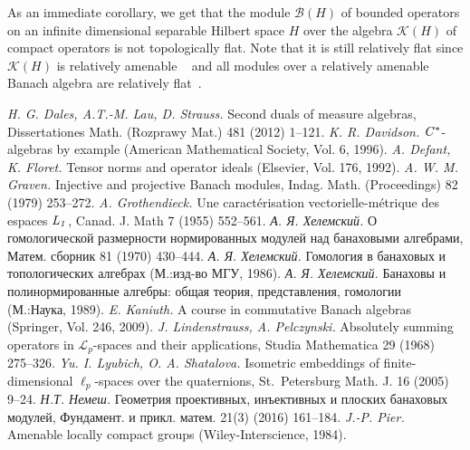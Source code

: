 \documentclass[12pt]{article}
\begin{document}
As an immediate corollary, we get that the module $\mathcal{B}(H)$ of bounded
operators on an infinite dimensional separable Hilbert space $H$ over the
algebra $\mathcal{K}(H)$ of compact operators is not topologically flat. Note
that it is still relatively flat since $\mathcal{K}(H)$ is relatively amenable
~\cite[VII.1.89]{HelBanLocConvAlg} and all modules over a relatively amenable
Banach algebra are relatively flat~\cite[VII.1.60(I)]{HelBanLocConvAlg}.


\begin{thebibliography}{999}

\textit{H. G. Dales, A.T.-M. Lau, D. Strauss.} Second duals of measure algebras,
Dissertationes Math. (Rozprawy Mat.) 481 (2012) 1--121.
%
\textit{K. R. Davidson.} $\it{C^*}$-algebras by example (American Mathematical
Society, Vol. 6, 1996).
%
\textit{A. Defant, K. Floret.} Tensor norms and operator ideals (Elsevier, Vol.
176, 1992).
%
\textit{A. W. M. Graven.} Injective and projective Banach modules, Indag. Math.
(Proceedings) 82 (1979) 253--272.
%
\textit{A. Grothendieck.} Une caract{\'e}risation vectorielle-m{\'e}trique des
espaces $\it{L}_1$, Canad. J. Math 7 (1955) 552--561.
%
\textit{А. Я. Хелемский.} О гомологической размерности нормированных модулей над
банаховыми алгебрами, Матем. сборник 81 (1970) 430--444.
%
\textit{А. Я. Хелемский.} Гомология в банаховых и топологических алгебрах
(М.:изд-во МГУ, 1986).
%
\textit{А. Я. Хелемский.} Банаховы и полинормированные алгебры: общая теория,
представления, гомологии (М.:Наука, 1989).
%
\textit{E. Kaniuth.} A course in commutative Banach algebras (Springer, Vol.
246, 2009).
%
\textit{J. Lindenstrauss, A. Pelczynski.} Absolutely summing operators in
$\mathcal{L}_p$-spaces and their applications, Studia Mathematica 29 (1968)
275--326.
%
\textit{Yu. I. Lyubich, O. A. Shatalova.} Isometric embeddings of
finite-dimensional $\ell_p$-spaces over the quaternions, St.~Petersburg Math. J.
16 (2005) 9--24.
%
\textit{Н.Т. Немеш.} Геометрия проективных, инъективных и плоских банаховых
модулей, Фундамент. и прикл. матем. 21(3) (2016) 161--184.
%
\textit{J.-P. Pier.} Amenable locally compact groups (Wiley-Interscience, 1984).
%

\end{thebibliography}
\end{document}

